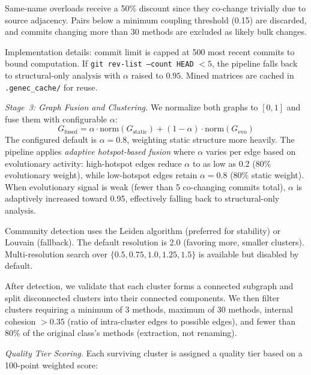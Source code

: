 \documentclass[sigconf]{acmart}
\begin{document}
Same-name overloads receive a 50\% discount since they co-change trivially due
to source adjacency. Pairs below a minimum coupling threshold (0.15) are
discarded, and commits changing more than 30 methods are excluded as likely bulk
changes.

Implementation details: commit limit is capped at 500 most recent commits to
bound computation. If \texttt{git rev-list --count HEAD} $< 5$, the pipeline
falls back to structural-only analysis with $\alpha$ raised to $0.95$. Mined
matrices are cached in \texttt{.genec\_cache/} for reuse.

\textit{Stage~3: Graph Fusion and Clustering.}  We normalize both graphs to
$[0,1]$ and fuse them with configurable $\alpha$:
{\small
\begin{equation}
G_{\text{fused}} = \alpha \!\cdot\! \text{norm}(G_{\text{static}})
  + (1 {-} \alpha) \!\cdot\! \text{norm}(G_{\text{evo}})
\label{eq:fusion}
\end{equation}
}%
The configured default is $\alpha = 0.8$, weighting static structure more
heavily. The pipeline applies \emph{adaptive hotspot-based fusion} where
$\alpha$ varies per edge based on evolutionary activity: high-hotspot edges
reduce $\alpha$ to as low as 0.2 (80\% evolutionary weight), while low-hotspot
edges retain $\alpha=0.8$ (80\% static weight). When evolutionary signal is
weak (fewer than 5 co-changing commits total), $\alpha$ is adaptively increased
toward 0.95, effectively falling back to structural-only analysis.

Community detection uses the Leiden algorithm (preferred for stability) or
Louvain (fallback).  The default resolution is 2.0 (favoring more, smaller
clusters).  Multi-resolution search over
$\{0.5,\allowbreak 0.75,\allowbreak 1.0,\allowbreak 1.25,\allowbreak 1.5\}$
is available but disabled by default.

After detection, we validate that each cluster forms a connected subgraph and
split disconnected clusters into their connected components. We then filter
clusters requiring a minimum of 3 methods, maximum of 30 methods, internal
cohesion $> 0.35$ (ratio of intra-cluster edges to possible edges), and fewer
than 80\% of the original class's methods (extraction, not renaming).

\textit{Quality Tier Scoring.}  Each surviving cluster is assigned a quality
tier based on a 100-point weighted score:
\end{document}
